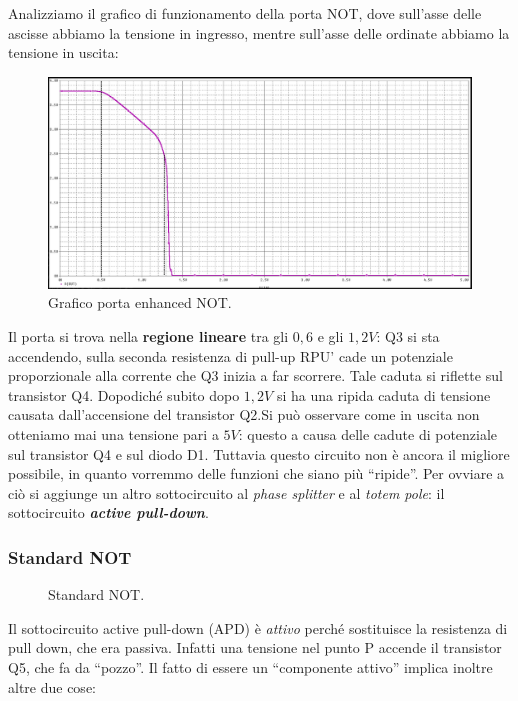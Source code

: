 \documentclass[
]{book}
\begin{document}
Analizziamo il grafico di funzionamento della porta NOT, dove sull'asse
delle ascisse abbiamo la tensione in ingresso, mentre sull'asse delle
ordinate abbiamo la tensione in uscita:

\begin{figure}
\centering
\includegraphics[width=0.6\linewidth,height=\textheight,keepaspectratio]{assets/imgs/enhanced_not.png}
\caption{Grafico porta enhanced NOT.}
\end{figure}

Il porta si trova nella \textbf{regione lineare} tra gli \(0,6\) e gli
\(1,2V\): Q3 si sta accendendo, sulla seconda resistenza di pull-up RPU'
cade un potenziale proporzionale alla corrente che Q3 inizia a far
scorrere. Tale caduta si riflette sul transistor Q4. Dopodiché subito
dopo \(1,2V\) si ha una ripida caduta di tensione causata
dall'accensione del transistor Q2.\newline Si può osservare come in
uscita non otteniamo mai una tensione pari a \(5V\): questo a causa
delle cadute di potenziale sul transistor Q4 e sul diodo D1.\newline
Tuttavia questo circuito non è ancora il migliore possibile, in quanto
vorremmo delle funzioni che siano più ``ripide''. Per ovviare a ciò si
aggiunge un altro sottocircuito al \emph{phase splitter} e al
\emph{totem pole}: il sottocircuito \textbf{\emph{active pull-down}}.

\subsubsection{Standard NOT}\label{standard-not}

\begin{figure}[H]
    \centering
    \resizebox{0.8\textwidth}{!}{}
    \caption{Standard NOT.}
\end{figure}

Il sottocircuito active pull-down (APD) è \emph{attivo} perché
sostituisce la resistenza di pull down, che era passiva. Infatti una
tensione nel punto P accende il transistor Q5, che fa da ``pozzo''. Il
fatto di essere un ``componente attivo'' implica inoltre altre due cose:
\end{document}
